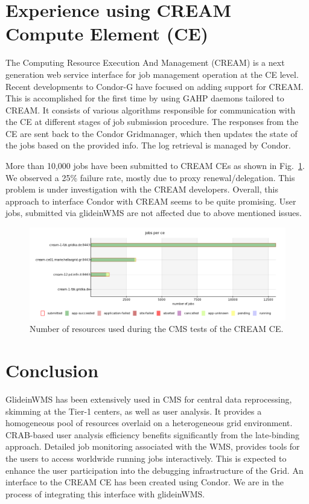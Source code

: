\documentclass[a4paper]{jpconf}
\begin{document}
\section{Experience using CREAM Compute Element (CE)}
The Computing Resource Execution And Management (CREAM) is a next generation web service interface 
for job management operation at the CE level. Recent developments to Condor-G have focused on adding 
support for CREAM. This is accomplished for the first time by using GAHP daemons tailored to CREAM.
It consists of various algorithms responsible for communication with the CE at different stages of job submission
procedure. The responses from the CE are sent back to the Condor Gridmanager, which then updates 
the state of the jobs based on the provided info. The log retrieval is managed by Condor.

More than 10,000 jobs have been submitted to CREAM CEs as shown in Fig.~\ref{fig:cms_cream}. We observed a 25\% failure 
rate, mostly due to proxy renewal/delegation. This problem is under investigation with the CREAM developers. 
Overall, this approach to interface Condor with CREAM seems to be quite promising. User jobs, submitted via
glideinWMS are not affected due to above mentioned issues. 
\begin{figure}
\begin{center}
\includegraphics[scale=0.45]{cms_cream}
\end{center}
\caption{Number of resources used during the CMS tests of the CREAM CE.}
\label{fig:cms_cream}
\end{figure}
\section{Conclusion}
GlideinWMS has been extensively used in CMS for central data reprocessing, skimming at the Tier-1 centers, as well
as user analysis. It provides a homogeneous pool of resources overlaid on a heterogeneous grid environment. 
CRAB-based user analysis efficiency benefits significantly from the late-binding approach. Detailed job monitoring 
associated with the WMS, provides tools for the users to access worldwide running  
jobs interactively. This is expected to enhance the user participation into the debugging 
infrastructure of the Grid. An interface to the CREAM CE has been created using Condor. We are in the 
process of integrating this interface with glideinWMS.  
\end{document}
